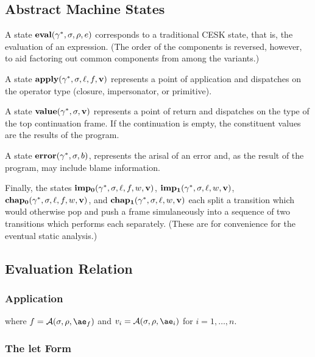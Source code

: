 \subsection{Abstract Machine States}

A state $\mathbf{eval}(\gamma^*,\sigma,\rho,e)$ corresponds to a traditional CESK state, that is, the evaluation of an expression.
(The order of the components is reversed, however, to aid factoring out common components from among the variants.)

A state $\mathbf{apply}(\gamma^*,\sigma,\ell,f,\mathbf{v})$ represents a point of application and dispatches on the operator type (closure, impersonator, or primitive).

A state $\mathbf{value}(\gamma^*,\sigma,\mathbf{v})$ represents a point of return and dispatches on the type of the top continuation frame.
If the continuation is empty, the constituent values are the results of the program.

A state $\mathbf{error}(\gamma^*,\sigma,b)$, represents the arisal of an error and, as the result of the program, may include blame information.

Finally, the states $\mathbf{imp_0}(\gamma^*,\sigma,\ell,f,w,\mathbf{v})$, $\mathbf{imp_1}(\gamma^*,\sigma,\ell,w,\mathbf{v})$, $\mathbf{chap_0}(\gamma^*,\sigma,\ell,f,w,\mathbf{v})$, and $\mathbf{chap_1}(\gamma^*,\sigma,\ell,w,\mathbf{v})$ each split a transition which would otherwise pop and push a frame simulaneously into a sequence of two transitions which performs each separately.
(These are for convenience for the eventual static analysis.)

\subsection{Evaluation Relation}

\subsubsection{Application}

\noindent
{}

\noindent
where $f=\A{\sigma}{\rho}{\ae_f}$ and $v_i=\A{\sigma}{\rho}{\ae_i}$ for $i=1,\dots,n$.

\subsubsection{The let Form}

\noindent
{}

